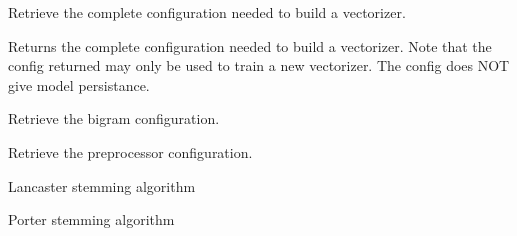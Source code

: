 \documentclass[letterpaper,10pt,english]{sphinxmanual}
\begin{document}
\begin{fulllineitems}
\begin{fulllineitems}
\label{\detokenize{KUHERD:KUHERD.HerdVectorizer.HerdVectorizer.getConfig}}
Retrieve the complete configuration needed to build a vectorizer.

Returns the complete configuration needed to build a vectorizer. Note that the config returned may only be used
to train a new vectorizer. The config does NOT give model persistance.

\end{fulllineitems}


\begin{fulllineitems}
\label{\detokenize{KUHERD:KUHERD.HerdVectorizer.HerdVectorizer.get_bigram_config}}
Retrieve the bigram configuration.

\end{fulllineitems}


\begin{fulllineitems}
\label{\detokenize{KUHERD:KUHERD.HerdVectorizer.HerdVectorizer.get_preproc_config}}
Retrieve the preprocessor configuration.

\end{fulllineitems}


\begin{fulllineitems}
\label{\detokenize{KUHERD:KUHERD.HerdVectorizer.HerdVectorizer.lancaster_stemmer}}
Lancaster stemming algorithm

\end{fulllineitems}


\begin{fulllineitems}
\label{\detokenize{KUHERD:KUHERD.HerdVectorizer.HerdVectorizer.porter_stemmer}}
Porter stemming algorithm


\end{fulllineitems}
\end{fulllineitems}
\end{document}
